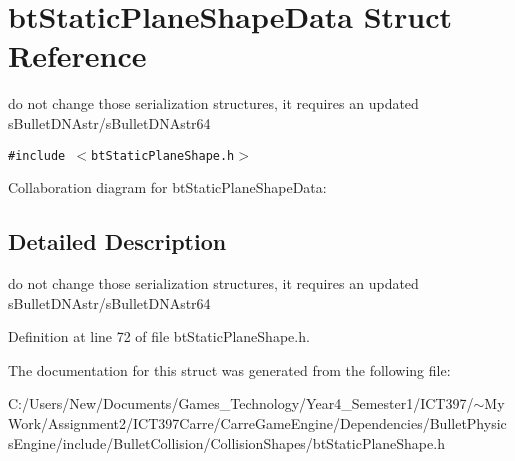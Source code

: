 \hypertarget{structbt_static_plane_shape_data}{
\section{btStaticPlaneShapeData Struct Reference}
\label{structbt_static_plane_shape_data}
}
do not change those serialization structures, it requires an updated sBulletDNAstr/sBulletDNAstr64  


{\tt \#include $<$btStaticPlaneShape.h$>$}

Collaboration diagram for btStaticPlaneShapeData:

\subsection{Detailed Description}
do not change those serialization structures, it requires an updated sBulletDNAstr/sBulletDNAstr64 

Definition at line 72 of file btStaticPlaneShape.h.

The documentation for this struct was generated from the following file:\begin{CompactItemize}
\item 
C:/Users/New/Documents/Games\_\-Technology/Year4\_\-Semester1/ICT397/$\sim$My Work/Assignment2/ICT397Carre/CarreGameEngine/Dependencies/BulletPhysicsEngine/include/BulletCollision/CollisionShapes/btStaticPlaneShape.h\end{CompactItemize}
